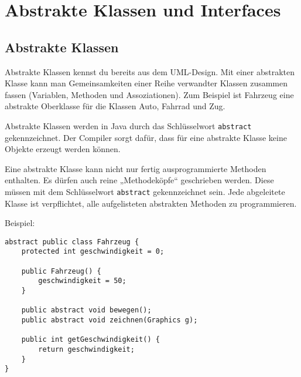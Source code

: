 \chapter{Abstrakte Klassen und Interfaces}
\renewcommand{\chaptertitle}{Abstrakte Klassen und Interfaces}

\lehead[]{\sf\hspace*{-2.00cm}\textcolor{white}{\colorbox{lightblue}{\makebox[1.60cm][r]{\thechapter}}}\hspace{0.17cm}\textcolor{lightblue}{\chaptertitle}}
\rohead[]{\textcolor{lightblue}{\chaptertitle}\sf\hspace*{0.17cm}\textcolor{white}{\colorbox{lightblue}{\makebox[1.60cm][l]{\thechapter}}}\hspace{-2.00cm}}
\rehead[]{\textcolor{lightblue}{AvHG, Inf, My}}
\lohead[]{\textcolor{lightblue}{AvHG, Inf, My}}

\lstset{style=myJava}

\section{Abstrakte Klassen}

Abstrakte Klassen kennst du bereits aus dem UML-Design. Mit einer abstrakten
Klasse kann man Gemeinsamkeiten einer Reihe verwandter Klassen zusammen fassen
(Variablen, Methoden und Assoziationen). Zum Beispiel ist Fahrzeug eine
abstrakte Oberklasse für die Klassen Auto, Fahrrad und Zug.

Abstrakte Klassen werden in Java durch das Schlüsselwort \lstinline|abstract|
gekennzeichnet. Der Compiler sorgt dafür, dass für eine abstrakte Klasse keine
Objekte erzeugt werden können.

Eine abstrakte Klasse kann nicht nur fertig ausprogrammierte Methoden
enthalten. Es dürfen auch reine „Methodeköpfe“ geschrieben werden. Diese müssen
mit dem Schlüsselwort \lstinline|abstract| gekennzeichnet sein. Jede
abgeleitete Klasse ist verpflichtet, alle aufgelisteten abstrakten Methoden zu
programmieren.

Beispiel:

\begin{lstlisting}
abstract public class Fahrzeug {
    protected int geschwindigkeit = 0;

    public Fahrzeug() {
        geschwindigkeit = 50;
    }

    public abstract void bewegen();
    public abstract void zeichnen(Graphics g);
    
    public int getGeschwindigkeit() {
        return geschwindigkeit;
    }
}
\end{lstlisting}


